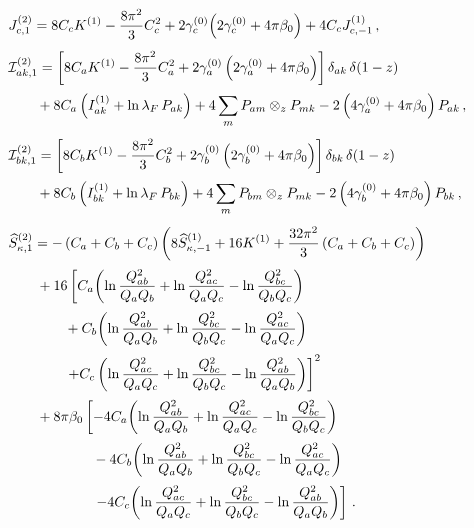 \begin{subequations}
\label{eq:C21-ingred}
\begin{align}
&J_{c,1}^{(2)} = 8C_c K^{(1)}-\frac{8\pi^2}{3}C_c^2
    +2\gamma_c^{(0)}\!\left(2\gamma_c^{(0)}+4\pi\beta_0\right)
    +4C_c J_{c,-1}^{(1)}\,, \\[1ex]
&\mathcal{I}_{ak,1}^{(2)} =
    \left[8C_a K^{(1)}-\frac{8\pi^2}{3}C_a^2
    +2\gamma_a^{(0)}\left(2\gamma_a^{(0)}+4\pi\beta_0\right)\right]
    \delta_{ak}\,\delta(1-z) \notag\\[0.5ex]
  &\qquad+8C_a\left(I_{ak}^{(1)}+\ln\lambda_F\,P_{ak}\right)
    +4\sum_m P_{am}\otimes_z P_{mk}
    -2\left(4\gamma_a^{(0)}+4\pi\beta_0\right)P_{ak}\,, \\[1ex]
&\mathcal{I}_{bk,1}^{(2)} =
    \left[8C_b K^{(1)}-\frac{8\pi^2}{3}C_b^2
    +2\gamma_b^{(0)}\left(2\gamma_b^{(0)}+4\pi\beta_0\right)\right]
    \delta_{bk}\,\delta(1-z) \notag\\[0.5ex]
  &\qquad+8C_b\left(I_{bk}^{(1)}+\ln\lambda_F\,P_{bk}\right)
    +4\sum_m P_{bm}\otimes_z P_{mk}
    -2\left(4\gamma_b^{(0)}+4\pi\beta_0\right)P_{bk}\,, \\[1ex]
&\widehat{S}_{\kappa,1}^{(2)} =-\left(C_a+C_b+C_c\right)\left(8\widehat{S}_{\kappa,-1}^{(1)}
    +16K^{(1)}+\frac{32\pi^2}{3}\left(C_a+C_b+C_c\right)\right) \notag \\[0.5ex]
    &\qquad+16\left[C_a\!\left(\ln\frac{Q_{ab}^2}{Q_a Q_b}
    +\ln\frac{Q_{ac}^2}{Q_a Q_c}-\ln\frac{Q_{bc}^2}{Q_b Q_c}\right)\right. \notag\\[0.5ex]
  &\qquad\qquad+C_b\!\left(\ln\frac{Q_{ab}^2}{Q_a Q_b}
    +\ln\frac{Q_{bc}^2}{Q_b Q_c}-\ln\frac{Q_{ac}^2}{Q_a Q_c}\right) \notag\\[0.5ex]
  &\left.\qquad\qquad+C_c\left(\ln\frac{Q_{ac}^2}{Q_a Q_c}
    +\ln\frac{Q_{bc}^2}{Q_b Q_c}
    -\ln\frac{Q_{ab}^2}{Q_a Q_b}\right)\right]^2\notag\\[0.5ex]
  &\qquad+8\pi\beta_0\left[-4C_a\!\left(\ln\frac{Q_{ab}^2}{Q_a Q_b}
    +\ln\frac{Q_{ac}^2}{Q_a Q_c}-\ln\frac{Q_{bc}^2}{Q_b Q_c}\right)\right. \notag\\[0.5ex]
  &\qquad\qquad\qquad-4C_b\!\left(\ln\frac{Q_{ab}^2}{Q_a Q_b}
    +\ln\frac{Q_{bc}^2}{Q_b Q_c}-\ln\frac{Q_{ac}^2}{Q_a Q_c}\right) \notag\\[0.5ex]
  &\left.\qquad\qquad\qquad-4C_c\!\left(\ln\frac{Q_{ac}^2}{Q_a Q_c}
    +\ln\frac{Q_{bc}^2}{Q_b Q_c}
    -\ln\frac{Q_{ab}^2}{Q_a Q_b}\right)\right]\,.
\end{align}
\end{subequations}

